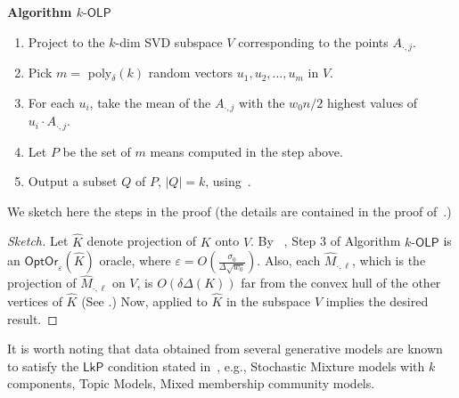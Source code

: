 \documentclass[11pt,letterpaper]{article}
\newcommand{\hatM}{{\widehat M}}
\newcommand{\hatK}{{\widehat K}}
\newcommand{\lkp}{{\mathsf {LkP}}\xspace}
\newcommand{\olp}{{\mathsf {OLP}}\xspace}
\newcommand{\kolp}{k\mbox{-}\olp}
\newcommand{\hMdot}[1]{{\hatM_{\cdot, #1}}}
\newcommand{\Adot}[1]{{A_{\cdot, #1}}}
\newcommand{\opto}{{\mathsf{OptOr}}}
\begin{document}
\begin{framed}

{\bf Algorithm $\kolp$}

\begin{enumerate}
\item Project to the $k$-dim SVD subspace $V$ corresponding to the points $\Adot{j}$.
\item Pick $m=$ poly$_\delta(k)$ random vectors $u_1,u_2,\ldots ,u_m$ in $V$.
\item For each $u_i$, take the mean of the $A_{\cdot,j}$ with the $w_0n/2$ highest values of $u_i\cdot A_{\cdot,j}$. 
\item Let $P$ be the  set of $m$ means computed in the step above.
\item Output a subset $Q$ of $P$, $|Q| = k$, using~. 
\end{enumerate}
\end{framed}

We sketch here the steps in the proof (the details are contained in the proof of~.) 

\begin{proof} [Sketch]
Let $\hatK$ denote projection of $K$ onto $V$. By~   , Step 3 of Algorithm $\kolp$ is an    $\opto_\varepsilon(\hatK)$ oracle, where $\varepsilon = {O\left(\frac{\sigma_0}{\Delta \sqrt{w_0}}\right)}$. Also, each $\hMdot{\ell}$, which is the projection of $\hMdot{\ell}$ on $V$, is $O(\delta\Delta(K))$ far from the convex hull of the other vertices of $\hatK$ (See .) Now,  applied  to $\hatK$ in the subspace $V$ implies the desired result. 
\end{proof}

It is worth noting that data obtained from several generative models are known to satisfy the $\lkp$ condition stated in~, e.g.,  Stochastic Mixture models with $k$ components, Topic Models, Mixed membership community models. 
\end{document}
